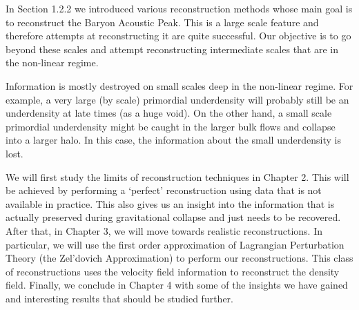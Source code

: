 In Section 1.2.2 we introduced various reconstruction methods whose main goal is to reconstruct the Baryon Acoustic Peak. This is a large scale feature and therefore attempts at reconstructing it are quite successful. Our objective is to go beyond these scales and attempt reconstructing intermediate scales that are in the non-linear regime. 

Information is mostly destroyed on small scales deep in the non-linear regime. For example, a very large (by scale) primordial underdensity will probably still be an underdensity at late times (as a huge void). On the other hand, a small scale primordial underdensity might be caught in the larger bulk flows and collapse into a larger halo. In this case, the information about the small underdensity is lost. 

We will first study the limits of reconstruction techniques in Chapter 2. This will be achieved by performing a `perfect' reconstruction using data that is not available in practice. This also gives us an insight into the information that is actually preserved during gravitational collapse and just needs to be recovered. After that, in Chapter 3, we will move towards realistic reconstructions. In particular, we will use the first order approximation of Lagrangian Perturbation Theory (the Zel'dovich Approximation) to perform our reconstructions. This class of reconstructions uses the velocity field information to reconstruct the density field. Finally, we conclude in Chapter 4 with some of the insights we have gained and interesting results that should be studied further.


